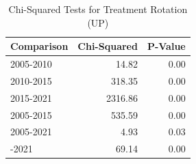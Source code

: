 \begin{table}[!h]
\centering
\caption{\label{tab:chi_sq_up}Chi-Squared Tests for Treatment Rotation (UP)}
\centering
\fontsize{8}{10}\selectfont
\begin{tabular}[t]{lrr}
\toprule
Comparison & Chi-Squared & P-Value\\
\midrule
2005-2010 & 14.82 & 0.00\\
2010-2015 & 318.35 & 0.00\\
2015-2021 & 2316.86 & 0.00\\
2005-2015 & 535.59 & 0.00\\
2005-2021 & 4.93 & 0.03\\
\addlinespace
2010-2021 & 69.14 & 0.00\\
\bottomrule
\end{tabular}
\end{table}
